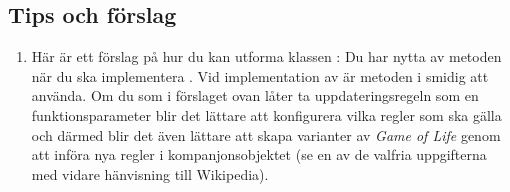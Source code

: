 \subsection{Tips och förslag}

\begin{enumerate}[leftmargin=*]
\item Här är ett förslag på hur du kan utforma klassen :
%
%
%
%
%
%
%
%
%
%
Du har nytta av metoden  när du ska implementera . Vid implementation av  är metoden  i  smidig att använda.
Om du som i förslaget ovan låter  ta uppdateringsregeln som en funktionsparameter blir det lättare att konfigurera vilka regler som ska gälla och därmed blir det även lättare att skapa varianter av \emph{Game of Life} genom att införa nya regler i kompanjonsobjektet (se en av de valfria uppgifterna med vidare hänvisning till Wikipedia).


\end{enumerate}
